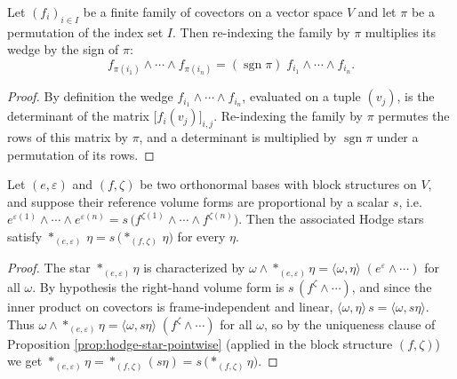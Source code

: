 \begin{lemma}
\label{lem:wedge-covectors-sign}
\leanok
{}
Let $(f_i)_{i \in I}$ be a finite family of covectors on a vector space $V$ and let $\pi$ be a permutation of the index set $I$. Then re-indexing the family by $\pi$ multiplies its wedge by the sign of $\pi$:
\[
f_{\pi(i_1)} \wedge \cdots \wedge f_{\pi(i_n)} = (\operatorname{sgn} \pi)\; f_{i_1} \wedge \cdots \wedge f_{i_n}.
\]
\end{lemma}
\begin{proof}
\leanok
By definition the wedge $f_{i_1} \wedge \cdots \wedge f_{i_n}$, evaluated on a tuple $(v_j)$, is the determinant of the matrix $\big[f_i(v_j)\big]_{i,j}$. Re-indexing the family by $\pi$ permutes the rows of this matrix by $\pi$, and a determinant is multiplied by $\operatorname{sgn} \pi$ under a permutation of its rows.
\end{proof}

\begin{lemma}
\label{lem:hodge-star-congr-smul}
\leanok
{}
Let $(e, \varepsilon)$ and $(f, \zeta)$ be two orthonormal bases with block structures on $V$, and suppose their reference volume forms are proportional by a scalar $s$, i.e.\ $e^{\varepsilon(1)} \wedge \cdots \wedge e^{\varepsilon(n)} = s\,\big(f^{\zeta(1)} \wedge \cdots \wedge f^{\zeta(n)}\big)$. Then the associated Hodge stars satisfy ${*}_{(e,\varepsilon)}\,\eta = s\,\big({*}_{(f,\zeta)}\,\eta\big)$ for every $\eta$.
\end{lemma}
\begin{proof}
\leanok
The star ${*}_{(e,\varepsilon)}\eta$ is characterized by $\omega \wedge {*}_{(e,\varepsilon)}\eta = \langle \omega, \eta\rangle\;(e^{\varepsilon} \wedge \cdots)$ for all $\omega$. By hypothesis the right-hand volume form is $s\,(f^{\zeta} \wedge \cdots)$, and since the inner product on covectors is frame-independent and linear, $\langle \omega, \eta\rangle\, s = \langle \omega, s\eta\rangle$. Thus $\omega \wedge {*}_{(e,\varepsilon)}\eta = \langle \omega, s\eta\rangle\;(f^{\zeta} \wedge \cdots)$ for all $\omega$, so by the uniqueness clause of Proposition \ref{prop:hodge-star-pointwise} (applied in the block structure $(f,\zeta)$) we get ${*}_{(e,\varepsilon)}\eta = {*}_{(f,\zeta)}(s\eta) = s\,\big({*}_{(f,\zeta)}\eta\big)$.
\end{proof}

